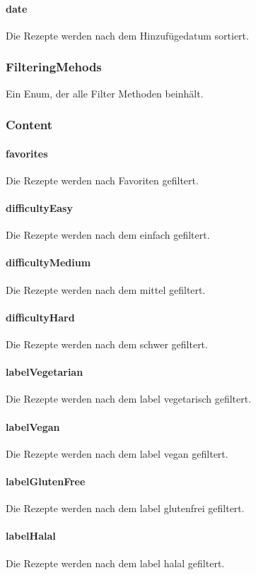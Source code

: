\documentclass{entwurfsheft}
\begin{document}
\paragraph*{date} Die Rezepte werden nach dem Hinzufügedatum sortiert.

\subsubsection{FilteringMehods}\label{sec:FilteringMehods}
Ein Enum, der alle Filter Methoden beinhält.
\subsubsection*{Content}
\paragraph*{favorites} Die Rezepte werden nach Favoriten gefiltert.
\paragraph*{difficultyEasy} Die Rezepte werden nach dem  einfach gefiltert.
\paragraph*{difficultyMedium} Die Rezepte werden nach dem  mittel gefiltert.
\paragraph*{difficultyHard} Die Rezepte werden nach dem  schwer gefiltert.
\paragraph*{labelVegetarian} Die Rezepte werden nach dem \gls{label} vegetarisch gefiltert.
\paragraph*{labelVegan} Die Rezepte werden nach dem \gls{label} vegan gefiltert.
\paragraph*{labelGlutenFree} Die Rezepte werden nach dem \gls{label} glutenfrei gefiltert.
\paragraph*{labelHalal} Die Rezepte werden nach dem \gls{label} halal gefiltert.
\end{document}
